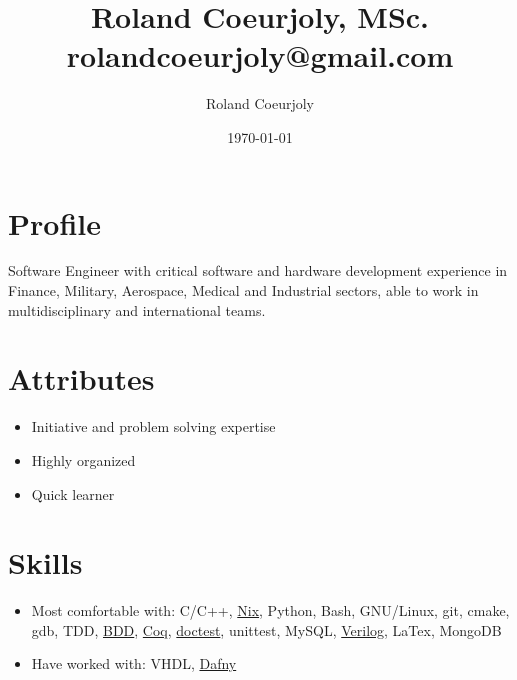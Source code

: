 \documentclass[11pt]{article}
\author{Roland Coeurjoly}
\date{\today}
\title{Roland Coeurjoly, MSc.\\\medskip
\large rolandcoeurjoly@gmail.com}
\begin{document}
\maketitle
\section*{Profile}
\label{sec:orgd3fc3e7}
Software Engineer with critical software and hardware development experience in Finance, Military, Aerospace, Medical and Industrial sectors, able to work in multidisciplinary and international teams.\\
\section*{Attributes}
\label{sec:org8deed6b}
\begin{itemize}
\item Initiative and problem solving expertise\\
\item Highly organized\\
\item Quick learner\\
\end{itemize}
\section*{Skills}
\label{sec:orgd630d4b}
\begin{itemize}
\item Most comfortable with: C/C++, \href{https://nixos.org/}{Nix}, Python, Bash, GNU/Linux, git, cmake, gdb, TDD, \href{https://www.agilealliance.org/glossary/bdd/}{BDD}, \href{https://coq.inria.fr/}{Coq}, \href{https://github.com/onqtam/doctest}{doctest}, unittest, MySQL, \href{https://github.com/RCoeurjoly/Space-Invaders}{Verilog}, LaTex, MongoDB\\
\item Have worked with: VHDL, \href{https://dafny.org/}{Dafny}\\
\end{itemize}
\end{document}
